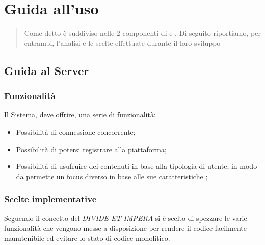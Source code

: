 \chapter{Guida all'uso}
  \begin{abstract}
    Come detto  è suddiviso nelle 2 componenti di  e . Di seguito riportiamo, per entrambi, l'analisi e le scelte effettuate durante il loro sviluppo
  \end{abstract}

  \section{Guida al Server}
    \subsection{Funzionalità}
      Il Sistema, deve offrire, una serie di funzionalità:
      \begin{itemize}
        \item Possibilità di connessione concorrente;
        \item Possibilità di potersi registrare alla piattaforma\footnotemark {};
        \item Possibilità di usufruire dei contenuti in base alla tipologia di utente, in modo da permette un focus diverso in base alle sue caratteristiche\footnotemark {} ;
      \end{itemize}

    \subsection{Scelte implementative}
        Seguendo il concetto del \emph{DIVIDE ET IMPERA}\footnotemark {} si è scelto di spezzare le varie funzionalità che vengono messe a disposizione per rendere il codice facilmente manutenibile ed evitare lo stato di codice monolitico\footnotemark {}.

